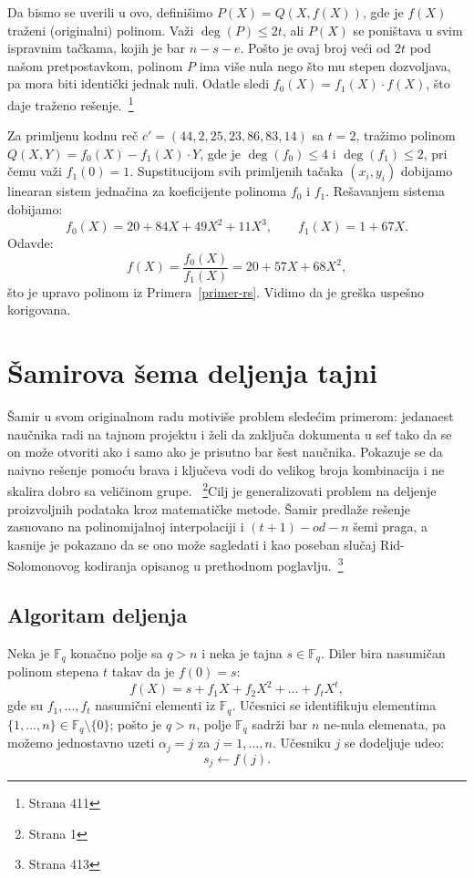 Da bismo se uverili u ovo, definišimo $P(X) = Q(X, f(X))$, gde je $f(X)$ traženi (originalni) polinom. Važi $\deg(P) \leq 2t$, ali $P(X)$ se poništava u svim ispravnim tačkama, kojih je bar $n - s - e$. Pošto je ovaj broj veći od $2t$ pod našom pretpostavkom, polinom $P$ ima više nula nego što mu stepen dozvoljava, pa mora biti identički jednak nuli. Odatle sledi $f_0(X) = f_1(X) \cdot f(X)$, što daje traženo rešenje.~\cite{smart2016cryptography}\footnote{Strana 411}
 
\begin{example}
Za primljenu kodnu reč $c' = (44, 2, 25, 23, 86, 83, 14)$ sa $t = 2$, tražimo polinom $Q(X,Y)=f_0(X)-f_1(X)\cdot Y$, gde je $\deg(f_0)\le 4$ i $\deg(f_1)\le 2$, pri čemu važi $f_1(0)=1$. Supstitucijom svih primljenih tačaka $(x_i,y_i)$ dobijamo linearan sistem jednačina za koeficijente polinoma $f_0$ i $f_1$.
Rešavanjem sistema dobijamo:
\[f_0(X) = 20 + 84X + 49X^2 + 11X^3, \qquad f_1(X) = 1 + 67X.\]
Odavde:
\[f(X) = \frac{f_0(X)}{f_1(X)} = 20 + 57X + 68X^2,\]
što je upravo polinom iz Primera~\ref{primer-rs}. Vidimo da je greška uspešno korigovana.
\end{example}

 
\section{Šamirova šema deljenja tajni}

Šamir u svom originalnom radu motiviše problem sledećim primerom: jedanaest naučnika radi na tajnom projektu i želi da zaključa dokumenta u sef tako da se on može otvoriti ako i samo ako je prisutno bar šest naučnika. Pokazuje se da naivno rešenje pomoću brava i ključeva vodi do velikog broja kombinacija i ne skalira dobro sa veličinom grupe.~\cite{shamir1979how} \footnote{Strana 1}Cilj je generalizovati problem na deljenje proizvoljnih podataka kroz matematičke metode. Šamir predlaže rešenje zasnovano na polinomijalnoj interpolaciji i $(t+1)-od-n$ šemi praga, a kasnije je pokazano da se ono može sagledati i kao poseban slučaj Rid-Solomonovog kodiranja opisanog u prethodnom poglavlju.~\cite{smart2016cryptography}\footnote{Strana 413}

\subsection{Algoritam deljenja}
Neka je $\mathbb{F}_q$ konačno polje sa $q > n$ i neka je tajna $s \in \mathbb{F}_q$. Diler bira nasumičan polinom stepena $t$ takav da je $f(0) = s$:
\[f(X) = s + f_1 X + f_2 X^2 + ... + f_t X^t,\]
gde su $f_1, \ldots, f_t$ nasumični elementi iz $\mathbb{F}_q$. Učesnici se identifikuju elementima $\{1, ..., n\} \in \mathbb{F}_q \setminus \{0\}$; pošto je $q > n$, polje $\mathbb{F}_q$ sadrži bar $n$ ne-nula elemenata, pa možemo jednostavno uzeti $\alpha_j = j$ za $j = 1, \ldots, n$. Učesniku $j$ se dodeljuje udeo:
\[s_j \leftarrow f(j).\]
 
